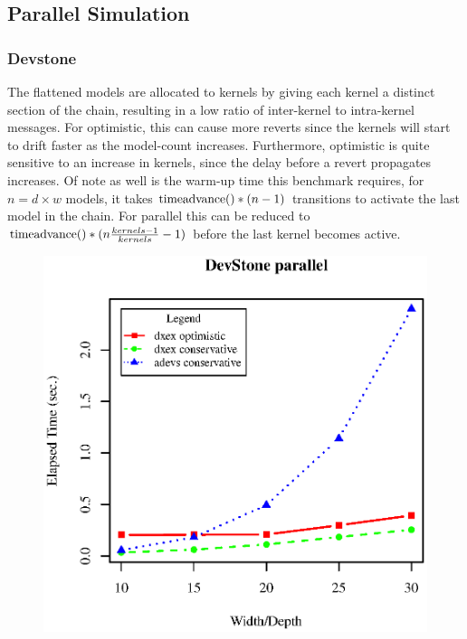 \subsection{Parallel Simulation}
\subsubsection{Devstone}
The flattened models are allocated to kernels by giving each kernel a distinct section of the chain, resulting in a low ratio of inter-kernel to intra-kernel messages. For optimistic, this can cause more reverts since the kernels will start to drift faster as the model-count increases. Furthermore, optimistic is quite sensitive to an increase in kernels, since the delay before a revert propagates increases. Of note as well is the warm-up time this benchmark requires, for $n=d\times w$ models, it takes $\textup{timeadvance}()*(n-1)$ transitions to activate the last model in the chain. For parallel this can be reduced to $\textup{timeadvance}()*(n\frac{kernels-1}{kernels} -1)$ before the last kernel becomes active.\\
\begin{figure}[ltbh]
	\includegraphics[width=.5\textwidth]{fig/fig2.eps}
	\label{fig2.eps}
\end{figure}
